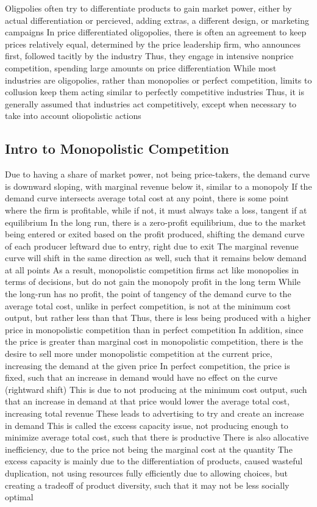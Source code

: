 \documentclass[11 pt, twoside]{article}
\newenvironment{outline*}
{
	\begin{outline}[enumerate]
	}
	{\end{outline}
}
\begin{document}
\begin{outline*}
\1 Oligpolies often try to differentiate products to gain market power, either by actual differentiation or percieved, adding extras, a different design, or marketing campaigns
\2 In price differentiated oligopolies, there is often an agreement to keep prices relatively equal, determined by the price leadership firm, who announces first, followed tacitly by the industry
\2 Thus, they engage in intensive nonprice competition, spending large amounts on price differentiation
\1 While most industries are oligopolies, rather than monopolies or perfect competition, limits to collusion keep them acting similar to perfectly competitive industries
\2 Thus, it is generally assumed that industries act competitively, except when necessary to take into account oliopolistic actions
\end{outline*}
\subsection{Intro to Monopolistic Competition}
\begin{outline*}
\1 Due to having a share of market power, not being price-takers, the demand curve is downward sloping, with marginal revenue below it, similar to a monopoly
\2 If the demand curve intersects average total cost at any point, there is some point where the firm is profitable, while if not, it must always take a loss, tangent if at equilibrium
\1 In the long run, there is a zero-profit equilibrium, due to the market being entered or exited based on the profit produced, shifting the demand curve of each producer leftward due to entry, right due to exit
\2 The marginal revenue curve will shift in the same direction as well, such that it remains below demand at all points
\2 As a result, monopolistic competition firms act like monopolies in terms of decisions, but do not gain the monopoly profit in the long term
\1 While the long-run has no profit, the point of tangency of the demand curve to the average total cost, unlike in perfect competition, is not at the minimum cost output, but rather less than that
\2 Thus, there is less being produced with a higher price in monopolistic competition than in perfect competition
\2 In addition, since the price is greater than marginal cost in monopolistic competition, there is the desire to sell more under monopolistic competition at the current price, increasing the demand at the given price
\3 In perfect competition, the price is fixed, such that an increase in demand would have no effect on the curve (rightward shift)
\3 This is due to not producing at the minimum cost output, such that an increase in demand at that price would lower the average total cost, increasing total revenue
\3 These leads to advertising to try and create an increase in demand
\2 This is called the excess capacity issue, not producing enough to minimize average total cost, such that there is productive
\3 There is also allocative inefficiency, due to the price not being the marginal cost at the quantity
\3 The excess capacity is mainly due to the differentiation of products, caused wasteful duplication, not using resources fully efficiently due to allowing choices, but creating a tradeoff of product diversity, such that it may not be less socially optimal
\end{outline*}
\end{document}
